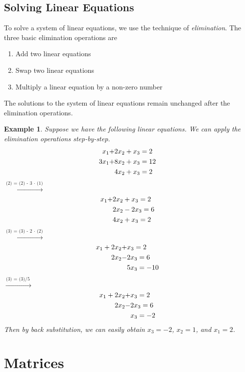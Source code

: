 \documentclass{article}
\newtheorem{example}{Example}[section]
\begin{document}
\subsection{Solving Linear Equations}
To solve a system of linear equations, we use the technique of \textit{elimination}. The three basic elimination operations are
\begin{enumerate}
    \item Add two linear equations
    \item Swap two linear equations
    \item Multiply a linear equation by a non-zero number
\end{enumerate}
The solutions to the system of linear equations remain unchanged after the elimination operations.

\begin{example}\label{ex_elim}
    Suppose we have the following linear equations. We can apply the elimination operations step-by-step. 
    \begin{align}
        x_1 + & 2x_2 + x_3 = 2 \\ \notag
        3x_1 + & 8x_2 + x_3 = 12 \\ \notag
        & 4x_2 + x_3 = 2 \notag
    \end{align}
    $\xrightarrow{\text{(2) = (2) - 3 $\cdot$ (1)}}$
    \begin{align}
        x_1 + & 2x_2 + x_3 = 2 \\ \notag
        & 2x_2 - 2x_3 = 6 \\ \notag
        & 4x_2 + x_3 = 2
    \end{align}
    $\xrightarrow{\text{(3) = (3) - 2 $\cdot$ (2)}}$
    \begin{align}
        x_1 + 2x_2 + & x_3 = 2 \\ \notag
        2x_2 - & 2x_3 = 6 \\ \notag
        & 5x_3 = -10
    \end{align}
    $\xrightarrow{\text{(3) = (3)/5 }}$
    \begin{align}
        x_1 + 2x_2 + & x_3 = 2 \\ \notag
        2x_2 - & 2x_3 = 6 \\ \notag
        & x_3 = -2
    \end{align}
    Then by back substitution, we can easily obtain $x_3=-2$, $x_2=1$, and $x_1=2$.
\end{example}

\section{Matrices}
\end{document}
